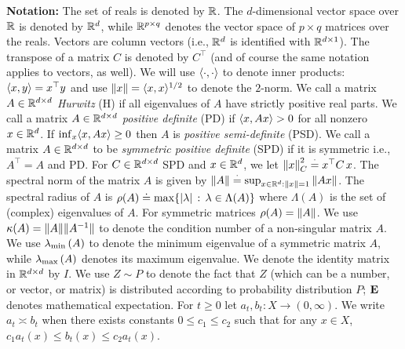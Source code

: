 \textbf{Notation:} The set of reals is denoted by $\mathbb{R}$. 
The $d$-dimensional vector space over $\mathbb{R}$ is denoted by $\mathbb{R}^{d}$,
while $\mathbb{R}^{p\times q}$ denotes the vector space of $p\times q$ matrices over the reals.
Vectors are column vectors (i.e., $\mathbb{R}^d$ is identified with $\mathbb{R}^{d\times 1}$).
The transpose of a matrix $C$ is denoted by $C^\top$
(and of course the same notation applies to vectors, as well). 
We will use $\langle\cdot,\cdot\rangle$ to denote inner products: $\langle x,y\rangle=x^\top y$
and use $\left\| x\right\| = \langle x,x\rangle^{1/2}$ to denote the $2$-norm.
We call a matrix $A\in \mathbb{R}^{d \times d}$  \emph{Hurwitz} (H) if all eigenvalues of $A$ have strictly positive real parts. 
We call a matrix $A\in \mathbb{R}^{d \times d}$ \emph{positive definite} (PD) if $\langle x,Ax\rangle >0$ for all nonzero $x \in \mathbb{R}^{d}$.
If $\inf_x \langle x,Ax\rangle\ge 0$ then $A$ is \emph{positive semi-definite} (PSD).
We call a matrix $A\in \mathbb{R}^{d \times d}$ to be \emph{symmetric positive definite} (SPD) if 
it is symmetric i.e., $A^\top=A$ and PD. 
For $C\in \mathbb{R}^{d \times d}$ SPD and $x\in \mathbb{R}^d$, we let $\left\| x\right\|^2_C\stackrel{\cdot}{=} x^\top C \,x$.
The spectral norm of the matrix $A$ is given by $\left\| A\right\|\stackrel{\cdot}{=} \sup_{x\in \mathbb{R}^d:\left\| x\right\|=1} \left\| Ax\right\|$.  
The spectral radius of $A$ is $\rho(A)\doteq \max\{ |\lambda|\,:\, \lambda \in \Lambda(A) \}$ where $\Lambda(A)$ is the set of (complex) eigenvalues of $A$. For symmetric matrices $\rho(A) = \left\| A\right\|$.
We use $\kappa(A)=\| A\|\| A^{-1}\|$ to denote the condition number of a non-singular matrix $A$. 
We use $\lambda_{\min}\left(A\right)$ to denote the minimum eigenvalue of a symmetric matrix $A$, while $\lambda_{\max}\left(A\right)$ denotes its maximum eigenvalue.
We denote the identity matrix in $\mathbb{R}^{d \times d}$ by $I$. 
We use $Z\sim P$ to denote the fact that $Z$ (which can be a number, or vector, or matrix) is distributed according to probability distribution $P$; $\mathbf{E}$ denotes mathematical expectation. 
For $t\ge 0$ let $a_t,b_t:X \to (0,\infty)$. We write $a_t\asymp b_t$ 
when there exists constants $0\le c_1\leq c_2$ such that for any $x\in X$, $c_1 a_t(x)\leq b_t(x)\leq c_2 a_t(x)$. 
